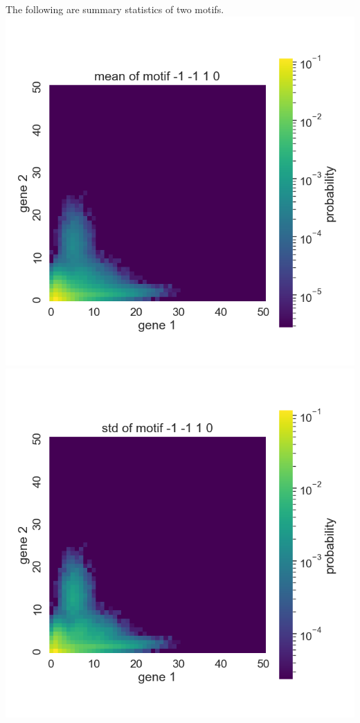 \documentclass[
]{article}
\begin{document}
The following are summary statistics of two motifs.
\includegraphics{../analysis/eda/first-set-heatmaps/summaries/08-mean.png}
\includegraphics{../analysis/eda/first-set-heatmaps/summaries/08-std.png}
\end{document}
